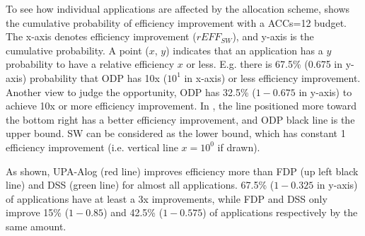 To see how individual applications are affected by the allocation scheme, 
 shows the cumulative probability of efficiency improvement with a ACCs=12 budget.
The x-axis denotes efficiency improvement ($rEFF_{SW}$), and y-axis is the cumulative probability.
A point ($x$, $y$) indicates that an application has a $y$ probability to have a relative efficiency $x$ or less.  
E.g. there is 67.5\% (0.675 in y-axis) probability that ODP has 10x ($10^1$ in x-axis) or less efficiency improvement. 
Another view to judge the opportunity, ODP has 32.5\% ($1-0.675$ in y-axis) to achieve 10x or more efficiency improvement. 
In , the line positioned more toward the bottom right has a better efficiency improvement, and ODP black line is the upper bound. 
SW can be considered as the lower bound, which has constant 1 efficiency improvement (i.e. vertical line $x = 10^0$ if drawn).

As  shown, UPA-Alog (red line) improves efficiency more than FDP (up left black line) and DSS (green line) for almost all applications. 
67.5\% ($1-0.325$ in y-axis) of applications have at least a 3x improvements, while FDP and DSS only improve 15\% ($1-0.85$) and 42.5\% ($1-0.575$) of applications respectively by the same amount. 
